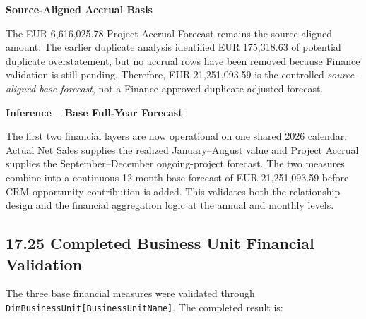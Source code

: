 \documentclass[11pt,a4paper]{article}
\begin{document}
\begin{warningbox}

\textbf{Source-Aligned Accrual Basis}

The EUR 6,616,025.78 Project Accrual Forecast remains the source-aligned amount.
The earlier duplicate analysis identified EUR 175,318.63 of potential duplicate
overstatement, but no accrual rows have been removed because Finance validation
is still pending. Therefore, EUR 21,251,093.59 is the controlled
\emph{source-aligned base forecast}, not a Finance-approved duplicate-adjusted
forecast.

\end{warningbox}

\begin{inferencebox}

\textbf{Inference -- Base Full-Year Forecast}

The first two financial layers are now operational on one shared 2026 calendar.
Actual Net Sales supplies the realized January--August value and Project Accrual
supplies the September--December ongoing-project forecast. The two measures
combine into a continuous 12-month base forecast of EUR 21,251,093.59 before
CRM opportunity contribution is added. This validates both the relationship
design and the financial aggregation logic at the annual and monthly levels.

\end{inferencebox}

\subsection{17.25 Completed Business Unit Financial Validation}

The three base financial measures were validated through
\texttt{DimBusinessUnit[BusinessUnitName]}. The completed result is:
\end{document}
